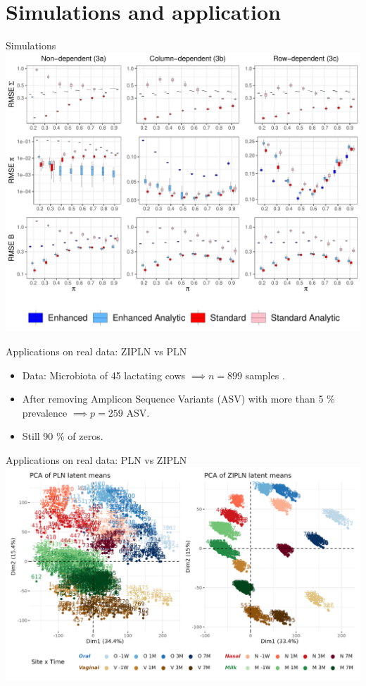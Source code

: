 \documentclass{beamer}
\theoremstyle{remark}
\begin{document}
\section{Simulations and application}
\begin{frame}{Simulations}
    \includegraphics[scale=0.30]{figures/proba_stat.pdf}
\end{frame}
\begin{frame}{Applications on real data: ZIPLN vs PLN}
    \begin{itemize}
        \item Data: Microbiota of 45 lactating cows $\implies n=899$ samples .
        \item After removing Amplicon Sequence Variants (ASV) with more than 5 \% prevalence $\implies p = 259$ ASV.
        \item Still 90 \% of zeros.
    \end{itemize}
\end{frame}
\begin{frame}{Applications on real data: PLN vs ZIPLN}
    \hspace{-0.75cm}\includegraphics[scale=0.45]{figures/microcosm_pca.png}
\end{frame}
\end{document}
